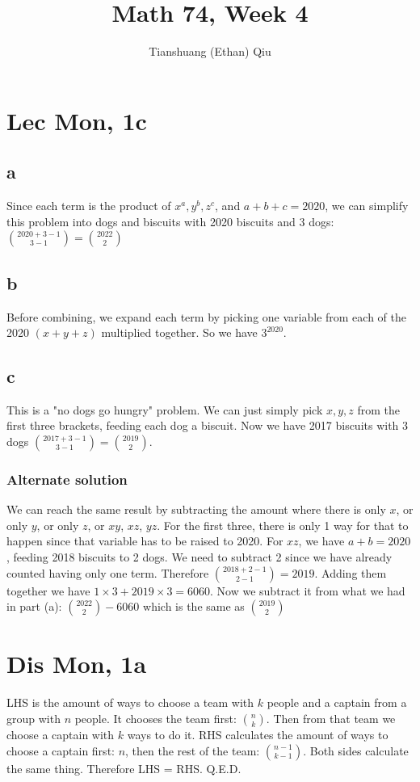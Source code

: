 \documentclass[12pt]{article}
\author{Tianshuang (Ethan) Qiu}
\begin{document}
\title{Math 74, Week 4}
\maketitle

\section{Lec Mon, 1c}
\subsection{a}
Since each term is the product of $x^a, y^b, z^c$, and $a+b+c = 2020$, we can simplify this problem into dogs and biscuits with 2020 biscuits and 3 dogs: $\binom{2020+3-1}{3-1} = \binom{2022}{2}$

\subsection{b}
Before combining, we expand each term by picking one variable from each of the 2020 $(x+y+z)$ multiplied together. So we have $3^{2020}$.

\subsection{c}
This is a "no dogs go hungry" problem. We can just simply pick $x,y,z$ from the first three brackets, feeding each dog a biscuit. Now we have 2017 biscuits with 3 dogs $\binom{2017+3-1}{3-1} = \binom{2019}{2}$.

\subsubsection{Alternate solution}
We can reach the same result by subtracting the amount where there is only $x$, or only $y$, or only $z$, or $xy$, $xz$, $yz$.
\newline
For the first three, there is only 1 way for that to happen since that variable has to be raised to 2020. For $xz$, we have $a+b = 2020$, feeding 2018 biscuits to 2 dogs. We need to subtract 2 since we have already counted having only one term. Therefore $\binom{2018+2-1}{2-1} = 2019$.
\newline
Adding them together we have $1 \times 3 + 2019 \times 3 = 6060$. Now we subtract it from what we had in part (a): $\binom{2022}{2}-6060$ which is the same as $\binom{2019}{2}$
\newpage


\section{Dis Mon, 1a}
LHS is the amount of ways to choose a team with $k$ people and a captain from a group with $n$ people. It chooses the team first: $\binom{n}{k}$. Then from that team we choose a captain with $k$ ways to do it.
\newline
RHS calculates the amount of ways to choose a captain first: $n$, then the rest of the team: $\binom{n-1}{k-1}$. Both sides calculate the same thing. Therefore LHS = RHS.
\newline
Q.E.D.
\end{document}
